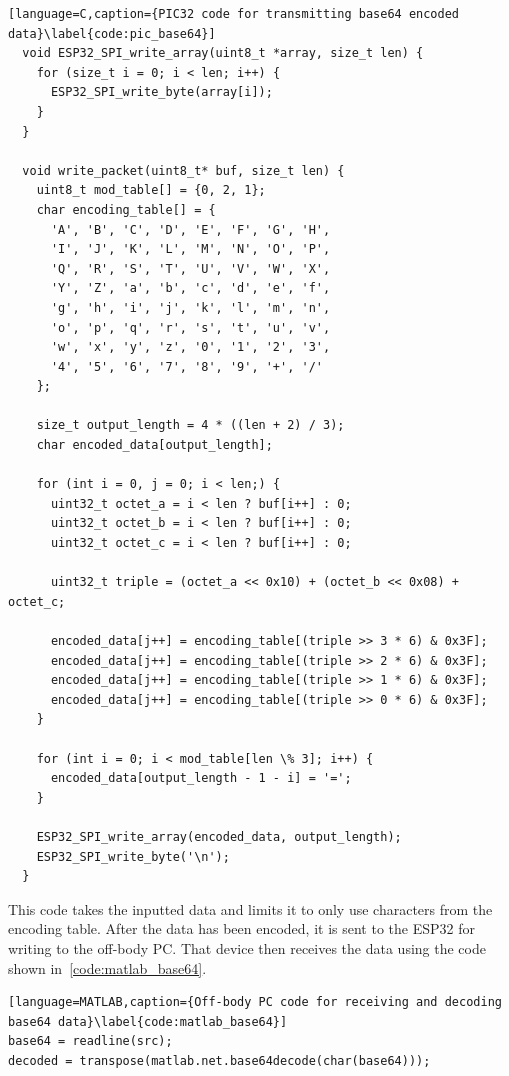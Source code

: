 \begin{lstlisting}[language=C,caption={PIC32 code for transmitting base64 encoded data}\label{code:pic_base64}]
  void ESP32_SPI_write_array(uint8_t *array, size_t len) {
    for (size_t i = 0; i < len; i++) {
      ESP32_SPI_write_byte(array[i]);
    }
  }

  void write_packet(uint8_t* buf, size_t len) {
    uint8_t mod_table[] = {0, 2, 1};
    char encoding_table[] = {
      'A', 'B', 'C', 'D', 'E', 'F', 'G', 'H',
      'I', 'J', 'K', 'L', 'M', 'N', 'O', 'P',
      'Q', 'R', 'S', 'T', 'U', 'V', 'W', 'X',
      'Y', 'Z', 'a', 'b', 'c', 'd', 'e', 'f',
      'g', 'h', 'i', 'j', 'k', 'l', 'm', 'n',
      'o', 'p', 'q', 'r', 's', 't', 'u', 'v',
      'w', 'x', 'y', 'z', '0', '1', '2', '3',
      '4', '5', '6', '7', '8', '9', '+', '/'
    };

    size_t output_length = 4 * ((len + 2) / 3);
    char encoded_data[output_length];

    for (int i = 0, j = 0; i < len;) {
      uint32_t octet_a = i < len ? buf[i++] : 0;
      uint32_t octet_b = i < len ? buf[i++] : 0;
      uint32_t octet_c = i < len ? buf[i++] : 0;

      uint32_t triple = (octet_a << 0x10) + (octet_b << 0x08) + octet_c;

      encoded_data[j++] = encoding_table[(triple >> 3 * 6) & 0x3F];
      encoded_data[j++] = encoding_table[(triple >> 2 * 6) & 0x3F];
      encoded_data[j++] = encoding_table[(triple >> 1 * 6) & 0x3F];
      encoded_data[j++] = encoding_table[(triple >> 0 * 6) & 0x3F];
    }

    for (int i = 0; i < mod_table[len \% 3]; i++) {
      encoded_data[output_length - 1 - i] = '=';
    }

    ESP32_SPI_write_array(encoded_data, output_length);
    ESP32_SPI_write_byte('\n');
  }
\end{lstlisting}

This code takes the inputted data and limits it to only use characters from the encoding table.
After the data has been encoded, it is sent to the ESP32 for writing to the off-body PC.
That device then receives the data using the code shown in~\autoref{code:matlab_base64}.

\begin{lstlisting}[language=MATLAB,caption={Off-body PC code for receiving and decoding base64 data}\label{code:matlab_base64}]
base64 = readline(src);
decoded = transpose(matlab.net.base64decode(char(base64)));
\end{lstlisting}

